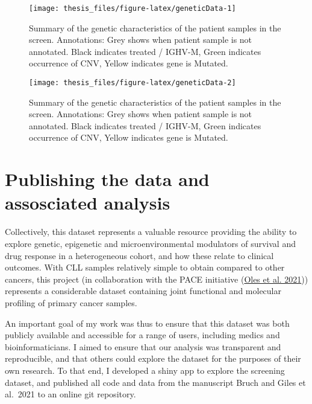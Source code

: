 \documentclass[11pt, a4paper, twosided]{book}
\begin{document}
\begin{figure}

{\centering \texttt{[image: thesis\_files/figure-latex/geneticData-1]} 

}

\caption{Summary of the genetic characteristics of the patient samples in the screen. Annotations: Grey shows when patient sample is not annotated. Black indicates treated / IGHV-M, Green indicates occurrence of CNV, Yellow indicates gene is Mutated.}\label{fig:geneticData-1}
\end{figure}
\begin{figure}

{\centering \texttt{[image: thesis\_files/figure-latex/geneticData-2]} 

}

\caption{Summary of the genetic characteristics of the patient samples in the screen. Annotations: Grey shows when patient sample is not annotated. Black indicates treated / IGHV-M, Green indicates occurrence of CNV, Yellow indicates gene is Mutated.}\label{fig:geneticData-2}
\end{figure}
\hypertarget{publishing-the-data-and-assosciated-analysis}{%
\section{Publishing the data and assosciated analysis}\label{publishing-the-data-and-assosciated-analysis}}

Collectively, this dataset represents a valuable resource providing the ability to explore genetic, epigenetic and microenvironmental modulators of survival and drug response in a heterogeneous cohort, and how these relate to clinical outcomes. With CLL samples relatively simple to obtain compared to other cancers, this project (in collaboration with the PACE initiative (\protect\hyperlink{ref-R-BloodCancerMultiOmics2017}{Oles et al. 2021})) represents a considerable dataset containing joint functional and molecular profiling of primary cancer samples.

An important goal of my work was thus to ensure that this dataset was both publicly available and accessible for a range of users, including medics and bioinformaticians. I aimed to ensure that our analysis was transparent and reproducible, and that others could explore the dataset for the purposes of their own research. To that end, I developed a shiny app to explore the screening dataset, and published all code and data from the manuscript Bruch and Giles et al.~2021 to an online git repository.
\end{document}

